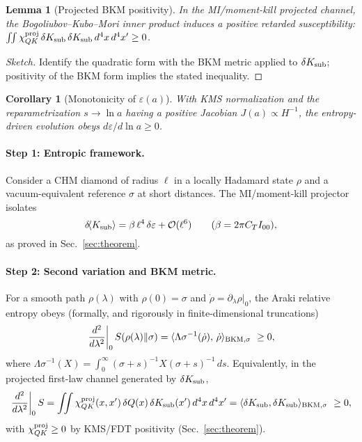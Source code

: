 \documentclass[aps,prd,onecolumn,superscriptaddress,nofootinbib]{revtex4-2}
\def\Omega_\Lambda{OmegaLambda}%
\newtheorem{lemma}{Lemma}
\newtheorem{corollary}{Corollary}
\begin{document}
\begin{lemma}[Projected BKM positivity]
In the MI/moment-kill projected channel, the Bogoliubov–Kubo–Mori inner product induces a positive retarded susceptibility: \(\iint \chi^{\rm proj}_{QK}\,\delta K_{\rm sub}\,\delta K_{\rm sub}\,d^4x\,d^4x' \ge 0\).
\end{lemma}
\begin{proof}[Sketch]
Identify the quadratic form with the BKM metric applied to \(\delta K_{\rm sub}\); positivity of the BKM form implies the stated inequality.
\end{proof}
\begin{corollary}[Monotonicity of \(\varepsilon(a)\)]
With KMS normalization and the reparametrization \(s\to\ln a\) having a positive Jacobian \(J(a)\propto H^{-1}\), the entropy-driven evolution obeys \(d\varepsilon/d\ln a\ge 0\).
\end{corollary}

\paragraph{Step 1: Entropic framework.}
Consider a CHM diamond of radius \(\ell\) in a locally Hadamard state \(\rho\) and a vacuum-equivalent reference \(\sigma\) at short distances. The MI/moment-kill projector isolates
\[
\delta\!\langle K_{\rm sub}\rangle=\beta\,\ell^4\,\delta\varepsilon+\mathcal O(\ell^6)\qquad(\beta=2\pi C_T I_{00}),
\]
as proved in Sec.~\ref{sec:theorem}.

\paragraph{Step 2: Second variation and BKM metric.}
For a smooth path \(\rho(\lambda)\) with \(\rho(0)=\sigma\) and \(\dot\rho=\partial_\lambda\rho|_0\),
the Araki relative entropy obeys (formally, and rigorously in finite-dimensional truncations)
\[
\left.\frac{d^2}{d\lambda^2}\right|_0 S(\rho(\lambda)\Vert\sigma)
=\langle \Omega_\sigma^{-1}(\dot\rho),\,\dot\rho\rangle_{\rm BKM,\sigma}\ \ge 0,
\]
where \(\Omega_\sigma^{-1}(X)=\int_0^\infty\!\!(\sigma+s)^{-1}X(\sigma+s)^{-1}\,ds\).
Equivalently, in the projected first-law channel generated by \(\delta K_{\rm sub}\),
\[
\left.\frac{d^2}{d\lambda^2}\right|_0 S
=\iint \chi^{\rm proj}_{QK}(x,x')\,\delta Q(x)\,\delta K_{\rm sub}(x')\,d^4x\,d^4x'
=\langle \delta K_{\rm sub},\delta K_{\rm sub}\rangle_{\rm BKM,\sigma}\ \ge 0,
\]
with \(\chi^{\rm proj}_{QK}\ge 0\) by KMS/FDT positivity (Sec.~\ref{sec:theorem}).
\end{document}
